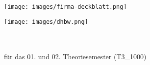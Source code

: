 


\begin{titlepage}
    
    \begin{center}
        \begin{minipage}[]{0.49\textwidth}
            \begin{flushleft}
                \texttt{[image: images/firma-deckblatt.png]}
            \end{flushleft}
        \end{minipage}
        \begin{minipage}[]{0.49\textwidth}
            \begin{flushright}
                \texttt{[image: images/dhbw.png]}
            \end{flushright}
        \end{minipage}
    \end{center}

    \enlargethispage{20mm}

    \begin{center}
        \vspace*{6mm}	{\arbeit}\\
        \doublespacing
        \vspace*{12mm}	{\LARGE\textbf{{\titel}}}\\
        \onehalfspacing
        \vspace*{12mm}	für das 01. und 02. Theoriesemester (T3\_1000)\\
        \vspace*{3mm}		\langartikelstudiengang{} \langstudiengang{} \textbf{\studiengang}\\
        \vspace*{3mm}		\langanderdh{} \dhbw\\
        \vspace*{7mm}	\langvon\\
        \vspace*{3mm}		{\large\textbf \autor}\\
        \vspace*{7mm}	\datumAbgabe\\
    \end{center}


\end{titlepage}
